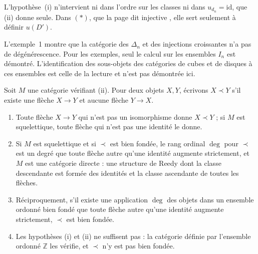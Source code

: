 \begin{remarque}
L'hypothèse~(i) n'intervient ni dans l'ordre sur les classes ni dans $u_{d_n} = \mathrm{id}$, que (ii) donne seule. Dans $(*)$, que la page dit injective , elle sert seulement à définir $u(D')$.
\end{remarque}

\begin{remarque}
L'exemple~1 montre que la catégorie des $\Delta_n$ et des injections croissantes n'a pas de dégénérescence. Pour les exemples, seul le calcul sur les ensembles $I_n$ est démontré. L'identification des sous-objets des catégories de cubes et de disques à ces ensembles est celle de la lecture et n'est pas démontrée ici.
\end{remarque}

\begin{enonce}
Soit $M$ une catégorie vérifiant (ii). Pour deux objets $X, Y$, écrivons $X \prec Y$ s'il existe une flèche $X \to Y$ et aucune flèche $Y \to X$.
\begin{enumerate}
\item Toute flèche $X \to Y$ qui n'est pas un isomorphisme donne $X \prec Y$ ; si $M$ est squelettique, toute flèche qui n'est pas une identité le donne.
\item Si $M$ est squelettique et si $\prec$ est bien fondée, le rang ordinal $\deg$ pour $\prec$ est un degré que toute flèche autre qu'une identité augmente strictement, et $M$ est une catégorie directe : une structure de Reedy dont la classe descendante est formée des identités et la classe ascendante de toutes les flèches.
\item Réciproquement, s'il existe une application $\deg$ des objets dans un ensemble ordonné bien fondé que toute flèche autre qu'une identité augmente strictement, $\prec$ est bien fondée.
\item Les hypothèses (i) et (ii) ne suffisent pas : la catégorie définie par l'ensemble ordonné $\mathbb Z$ les vérifie, et $\prec$ n'y est pas bien fondée.
\end{enumerate}
\end{enonce}

